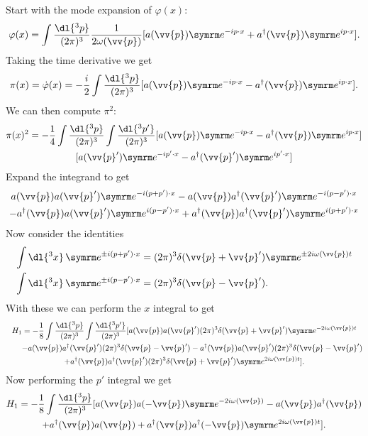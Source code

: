 Start with the mode expansion of \(\varphi(x)\):
\begin{equation}
    \varphi(x) = \int \frac{\dl{^3p}}{(2\pi)^3} \frac{1}{2\omega(\vv{p})} [a(\vv{p})\e^{-ip\cdot x} + a^\hermit(\vv{p}) \e^{ip\cdot x}].
\end{equation}
Taking the time derivative we get
\begin{equation}
    \pi(x) = \dot{\varphi}(x) = -\frac{i}{2} \int \frac{\dl{^3p}}{(2\pi)^3} [a(\vv{p})\e^{-ip\cdot x} - a^\hermit(\vv{p})\e^{ip\cdot x}].
\end{equation}
We can then compute \(\pi^2\):
\begin{multline}
    \pi(x)^2 = -\frac{1}{4} \int \frac{\dl{^3p}}{(2\pi)^3} \int \frac{\dl{^3p'}}{(2\pi)^3} [a(\vv{p})\e^{-ip\cdot x} - a^\hermit(\vv{p})\e^{ip\cdot x}]\\
    [a(\vv{p}')\e^{-ip'\cdot x} - a^\hermit(\vv{p}')\e^{ip'\cdot x}]
\end{multline}
Expand the integrand to get
\begin{multline}
    a(\vv{p})a(\vv{p}')\e^{-i(p + p') \cdot x} - a(\vv{p})a^\hermit(\vv{p}') \e^{-i(p - p')\cdot x}\\
    - a^\hermit(\vv{p}) a(\vv{p}') \e^{i(p - p')\cdot x} + a^\hermit(\vv{p})a^\hermit(\vv{p}')\e^{i(p + p')\cdot x}
\end{multline}
Now consider the identities
\begin{align}
    \int \dl{^3x} \, \e^{\pm i (p + p')\cdot x} &= (2\pi)^3\delta(\vv{p} + \vv{p}') \e^{\pm 2i\omega(\vv{p})t}\\
    \int \dl{^3x} \, \e^{\pm i(p - p')\cdot x} &= (2\pi)^3\delta(\vv{p} - \vv{p}').
\end{align}
With these we can perform the \(x\) integral to get
\begin{multline}
    H_1 = -\frac{1}{8} \int \frac{\dl{^3p}}{(2\pi)^3} \int \frac{\dl{^3p'}}{(2\pi)^3} [a(\vv{p})a(\vv{p}')(2\pi)^3\delta(\vv{p} + \vv{p}')\e^{-2i\omega(\vv{p})t}\\
    \qquad- a(\vv{p})a^\hermit(\vv{p}') (2\pi)^3 \delta(\vv{p} - \vv{p}') - a^\hermit(\vv{p}) a(\vv{p}') (2\pi)^3 \delta(\vv{p} - \vv{p}')\\
    + a^\hermit(\vv{p})a^\hermit(\vv{p}') (2\pi)^3\delta(\vv{p} + \vv{p}')\e^{2i\omega(\vv{p})t}].
\end{multline}
Now performing the \(p'\) integral we get
\begin{multline}
    H_1 = -\frac{1}{8} \int \frac{\dl{^3p}}{(2\pi)^3} [a(\vv{p})a(-\vv{p})\e^{-2i\omega(\vv{p})} - a(\vv{p})a^\hermit(\vv{p})\\
    + a^\hermit(\vv{p}) a(\vv{p}) + a^\hermit(\vv{p})a^\hermit(-\vv{p})\e^{2i\omega(\vv{p})t}].
\end{multline}
